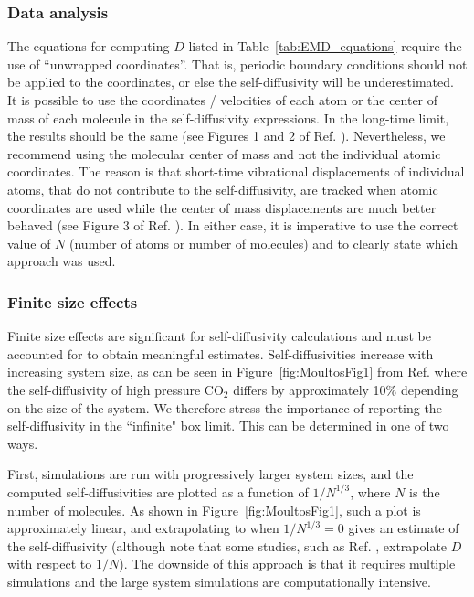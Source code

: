 \documentclass[9pt,bestpractices]{livecoms}
\begin{document}
\subsubsection{Data analysis} \label{sec:Self-Diffusivity:General: Data analysis}

The equations for computing $D$ listed in Table~\ref{tab:EMD_equations} require the use of ``unwrapped coordinates''. That is, periodic boundary conditions should not be applied to the coordinates, or else the self-diffusivity will be underestimated. It is possible to use the coordinates / velocities of each atom or the center of mass of each molecule in the self-diffusivity expressions. In the long-time limit, the results should be the same (see Figures 1 and 2 of Ref. \cite{Mondello1997}). Nevertheless, we recommend using the molecular center of mass and not the individual atomic coordinates. The reason is that short-time vibrational displacements of individual atoms, that do not contribute to the self-diffusivity, are tracked when atomic coordinates are used while the center of mass displacements are much better behaved (see Figure 3 of Ref. \cite{Mondello1997}). In either case, it is imperative to use the correct value of $N$ (number of atoms or number of molecules) and to clearly state which approach was used.

\subsubsection{Finite size effects} \label{sec:Self-Diffusivity:General: Finite size}

Finite size effects are significant for self-diffusivity calculations and must be accounted for to obtain meaningful estimates. Self-diffusivities increase with increasing system size, as can be seen in Figure~\ref{fig:MoultosFig1} from Ref. \cite{Moultos2016} where the self-diffusivity of high pressure CO$_2$ differs by approximately 10\% depending on the size of the system. We therefore stress the importance of reporting the self-diffusivity in the ``infinite" box limit. This can be determined in one of two ways. 

First, simulations are run with progressively larger system sizes, and the computed self-diffusivities are plotted as a function of $1/N^{1/3}$, where $N$ is the number of molecules. As shown in Figure~\ref{fig:MoultosFig1}, such a plot is approximately linear, and extrapolating to when $1/N^{1/3}=0$ gives an estimate of the self-diffusivity (although note that some studies, such as Ref. \cite{Daivis:1995}, extrapolate $D$ with respect to $1/N$). The downside of this approach is that it requires multiple simulations and the large system simulations are computationally intensive. 
\end{document}
